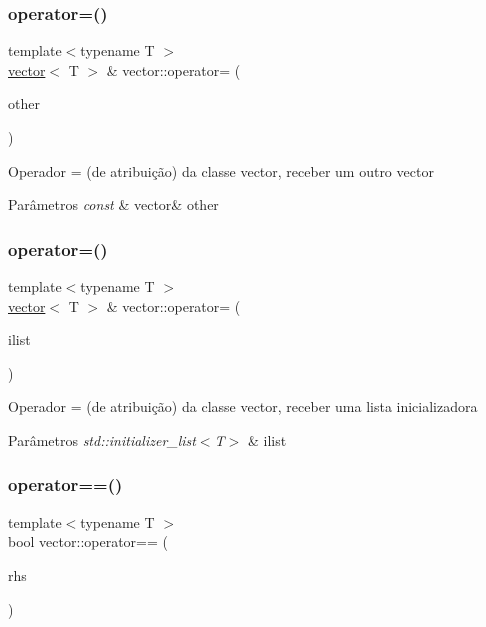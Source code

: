 \subsubsection{\texorpdfstring{operator=()}{operator=()}\hspace{0.1cm}{\footnotesize\ttfamily [1/2]}}
{\footnotesize\ttfamily template$<$typename T $>$ \\
\mbox{\hyperlink{classsc_1_1vector}{vector}}$<$ T $>$ \& vector\+::operator= (\begin{DoxyParamCaption}\item[{const \mbox{\hyperlink{classsc_1_1vector}{vector}}$<$ T $>$ \&}]{other }\end{DoxyParamCaption})}

Operador = (de atribuição) da classe vector, receber um outro vector 
\begin{DoxyParams}{Parâmetros}
{\em const} & vector\& other \\
\hline
\end{DoxyParams}
\mbox{\label{classsc_1_1vector_ac06042d1df3ec08ca421c33205a0a62b}} 
\subsubsection{\texorpdfstring{operator=()}{operator=()}\hspace{0.1cm}{\footnotesize\ttfamily [2/2]}}
{\footnotesize\ttfamily template$<$typename T $>$ \\
\mbox{\hyperlink{classsc_1_1vector}{vector}}$<$ T $>$ \& vector\+::operator= (\begin{DoxyParamCaption}\item[{std\+::initializer\+\_\+list$<$ T $>$}]{ilist }\end{DoxyParamCaption})}

Operador = (de atribuição) da classe vector, receber uma lista inicializadora 
\begin{DoxyParams}{Parâmetros}
{\em std\+::initializer\+\_\+list$<$\+T$>$} & ilist \\
\hline
\end{DoxyParams}
\mbox{\label{classsc_1_1vector_a764f351207d5e530d8e9e936b972f290}} 
\subsubsection{\texorpdfstring{operator==()}{operator==()}}
{\footnotesize\ttfamily template$<$typename T $>$ \\
bool vector\+::operator== (\begin{DoxyParamCaption}\item[{const \mbox{\hyperlink{classsc_1_1vector}{vector}}$<$ T $>$ \&}]{rhs }\end{DoxyParamCaption})}

